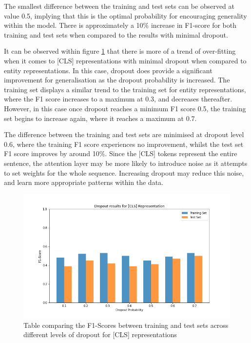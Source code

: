 \documentclass{l4proj}
\begin{document}
The smallest difference between the training and test sets can be observed at value 0.5, implying that this is the optimal probability for encouraging generality within the model. There is approximately a 10\% increase in F1-score for both training and test sets when compared to the results with minimal dropout. 

It can be observed within figure \ref{fig:F1cls} that there is more of a trend of over-fitting when it comes to [CLS] representations with minimal dropout when compared to entity representations. In this case, dropout does provide a significant improvement for generalisation as the dropout probability is increased. The training set displays a similar trend to the training set for entity representations, where the F1 score increases to a maximum at 0.3, and decreases thereafter. However, in this case once dropout reaches a minimum F1 score 0.5, the training set begins to increase again, where it reaches a maximum at 0.7. 

The difference between the training and test sets are minimised at dropout level 0.6, where the training F1 score experiences no improvement, whilst the test set F1 score improves by around 10\%. Since the [CLS] tokens represent the entire sentence, the attention layer may be more likely to introduce noise as it attempts to set weights for the whole sequence. Increasing dropout may reduce this noise, and learn more appropriate patterns within the data.

\begin{figure}[htb]
    \centering
    \includegraphics[width=14cm]{images/CLSDrop.png}
  \caption{Table comparing the F1-Scores between training and test sets across different levels of dropout for [CLS] representations}
  \label{fig:F1cls}
\end{figure}
\end{document}
